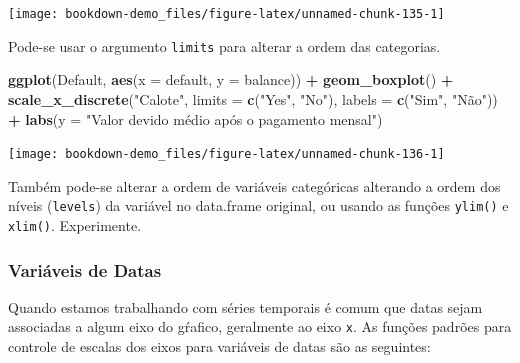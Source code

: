 \documentclass[]{book}
\newenvironment{Shaded}{\begin{snugshade}}{\end{snugshade}}
\newcommand{\KeywordTok}[1]{\textcolor[rgb]{0.13,0.29,0.53}{\textbf{#1}}}
\newcommand{\DataTypeTok}[1]{\textcolor[rgb]{0.13,0.29,0.53}{#1}}
\newcommand{\StringTok}[1]{\textcolor[rgb]{0.31,0.60,0.02}{#1}}
\newcommand{\OperatorTok}[1]{\textcolor[rgb]{0.81,0.36,0.00}{\textbf{#1}}}
\newcommand{\NormalTok}[1]{#1}
\begin{document}
\begin{center}\texttt{[image: bookdown-demo\_files/figure-latex/unnamed-chunk-135-1]} \end{center}

Pode-se usar o argumento \texttt{limits} para alterar a ordem das
categorias.

\begin{Shaded}
\begin{Highlighting}[]
\KeywordTok{ggplot}\NormalTok{(Default, }\KeywordTok{aes}\NormalTok{(}\DataTypeTok{x =}\NormalTok{ default, }\DataTypeTok{y =}\NormalTok{ balance)) }\OperatorTok{+}
\StringTok{  }\KeywordTok{geom_boxplot}\NormalTok{() }\OperatorTok{+}\StringTok{ }
\StringTok{  }\KeywordTok{scale_x_discrete}\NormalTok{(}\StringTok{"Calote"}\NormalTok{, }\DataTypeTok{limits =} \KeywordTok{c}\NormalTok{(}\StringTok{"Yes"}\NormalTok{, }\StringTok{"No"}\NormalTok{),}
                   \DataTypeTok{labels =} \KeywordTok{c}\NormalTok{(}\StringTok{"Sim"}\NormalTok{, }\StringTok{"Não"}\NormalTok{)) }\OperatorTok{+}
\StringTok{  }\KeywordTok{labs}\NormalTok{(}\DataTypeTok{y =} \StringTok{"Valor devido médio após o pagamento mensal"}\NormalTok{)}
\end{Highlighting}
\end{Shaded}

\begin{center}\texttt{[image: bookdown-demo\_files/figure-latex/unnamed-chunk-136-1]} \end{center}

Também pode-se alterar a ordem de variáveis categóricas alterando a
ordem dos níveis (\texttt{levels}) da variável no data.frame original,
ou usando as funções \texttt{ylim()} e \texttt{xlim()}. Experimente.

\subsubsection{Variáveis de Datas}\label{variaveis-de-datas}

Quando estamos trabalhando com séries temporais é comum que datas sejam
associadas a algum eixo do gŕafico, geralmente ao eixo \texttt{x}. As
funções padrões para controle de escalas dos eixos para variáveis de
datas são as seguintes:
\end{document}
